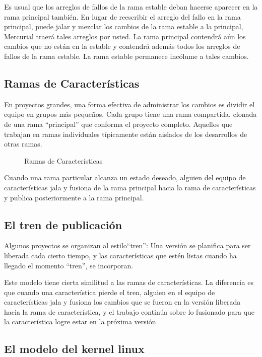 Es usual que los arreglos de fallos de la rama estable deban hacerse
aparecer en la rama principal también.  En lugar de reescribir el
arreglo del fallo en la rama principal, puede jalar y mezclar los
cambios de la rama estable a la principal, Mercurial traerá tales
arreglos por usted.
La rama principal contendrá aún los cambios que no están en la
estable y contendrá además todos los arreglos de fallos de la rama
estable.  La rama estable permanece incólume a tales cambios.

\subsection{Ramas de Características}

En proyectos grandes, una forma efectiva de administrar los cambios es
dividir el equipo en grupos más pequeños. Cada grupo tiene una rama
compartida, clonada de una rama ``principal'' que conforma el proyecto
completo.   Aquellos que trabajan en ramas individuales típicamente
están aislados de los desarrollos de otras ramas.

\begin{figure}[ht]
  \centering
  \caption{Ramas de Características}
  \label{fig:collab:feature-branches}
\end{figure}

Cuando una rama particular alcanza un estado deseado, alguien del
equipo de características jala y fusiona de la rama principal hacia
la rama de características y publica posteriormente a la rama principal.

\subsection{El tren de publicación}

Algunos proyectos se organizan al estilo``tren'': Una versión se
planifica para ser liberada cada cierto tiempo, y las características
que estén listas cuando ha llegado el momento ``tren'', se incorporan.

Este modelo tiene cierta similitud a las ramas de características. La
diferencia es que cuando una característica pierde el tren, alguien en
el equipo de características jala y fusiona los cambios que se fueron
en la versión liberada hacia la rama de característica, y el trabajo
continúa sobre lo fusionado para que la característica logre estar en
la próxima versión.

\subsection{El modelo del kernel linux}

